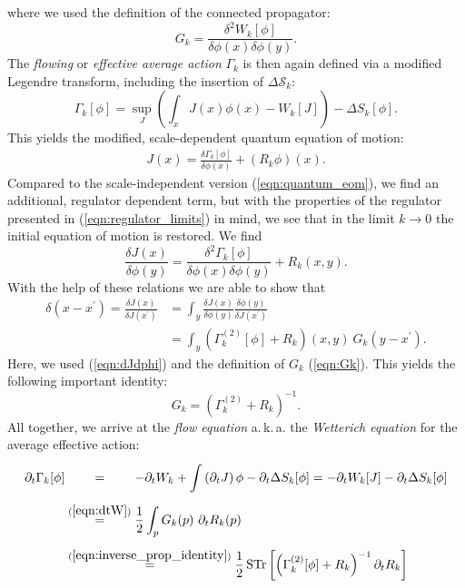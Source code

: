 where we used the definition of the connected propagator:
\begin{equation}
G_k = \frac{\delta^2 W_k[\phi]}{\delta\phi(x)\delta\phi(y)}.
\label{eqn:Gk}
\end{equation}
The \textit{flowing} or \textit{effective average action} $\Gamma_k$ is then again defined via a modified Legendre transform, including the insertion of $\Delta\mathcal{S}_k$:
\begin{equation}
	\Gamma_{k}[\phi]=\sup _{J}\left(\int_x J(x) \phi(x)-W_{k}[J]\right)-\Delta S_{k}[\phi].
\end{equation}
This yields the modified, scale-dependent quantum equation of motion:
\begin{align}
	J(x) = \frac{\delta\Gamma_k[\phi]}{\delta\phi(x)} + \left(R_k\phi\right)(x).
\end{align}
Compared to the scale-independent version (\ref{eqn:quantum_eom}), we find an additional, regulator dependent term, but with the properties of the regulator presented in (\ref{eqn:regulator_limits}) in mind, we see that in the limit $k\rightarrow 0 $ the initial equation of motion is restored.
We find
\begin{equation}
	\frac{\delta J(x)}{\delta \phi(y)}=\frac{\delta^{2} \Gamma_{k}[\phi]}{\delta \phi(x) \delta \phi(y)}+R_{k}(x, y).\label{eqn:dJdphi}
\end{equation}
With the help of these relations we are able to show that 
\begin{equation}
\begin{aligned} \delta\left(x-x^{\prime}\right) =\frac{\delta J(x)}{\delta J\left(x^{\prime}\right)}&=\int_y \frac{\delta J(x)}{\delta \phi(y)} \frac{\delta \phi(y)}{\delta J\left(x^{\prime}\right)} \\[10pt] &=\int_y\left(\Gamma_{k}^{(2)}[\phi]+R_{k}\right)(x, y) \ G_{k}\left(y-x^{\prime}\right).
\end{aligned}
\end{equation}
Here, we used (\ref{eqn:dJdphi}) and the definition of $G_k$ (\ref{eqn:Gk}). 
This yields the following important identity:
\begin{equation}
	G_k = \left(\Gamma_k^{(2)} + R_k\right)^{-1}.
	\label{eqn:inverse_prop_identity}
\end{equation}
All together, we arrive at the \textit{flow equation} a.\,k.\,a. the \textit{Wetterich equation} for the average effective action:
\begin{equation}
\begin{aligned}
\partial_t \Gamma_k[\phi] &\overset{\phantom{(\ref{eqn:dtW})}}{=} -\partial_t W_k +\int\left(\partial_t J\right) \phi - \partial_t \Delta S_k[\phi] = - \partial_t W_k[J] - \partial_t \Delta S_k[\phi] \\[5pt] 
&\overset{(\ref{eqn:dtW})}{=} \frac{1}{2} \int_p G_{k}(p) \ \partial_{t} R_{k}(p)\\[5pt]
&\overset{(\ref{eqn:inverse_prop_identity})}{=}\frac{1}{2} \operatorname{STr}\left[\left(\Gamma_{k}^{(2)}[\phi]+R_{k}\right)^{-1}\partial_{t} R_{k}\right] 
\end{aligned}
\label{eqn:Wetterich}
\end{equation}
